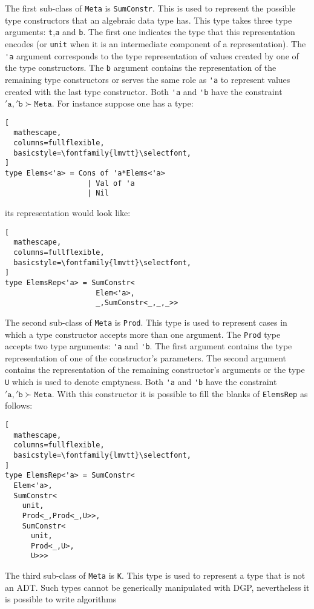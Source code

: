 \documentclass{sigplanconf}
\begin{document}
The first sub-class of \verb+Meta+ is \verb+SumConstr+. This is used
to represent the possible type constructors that an algebraic data
type has. This type takes three type arguments: \verb+t+,\verb+a+ and
\verb+b+. The first one indicates the type that this representation
encodes (or \verb+unit+ when it is an intermediate component of a
representation). The \verb+'a+ argument corresponds to the type
representation of values created by one of the type constructors. The
\verb+b+ argument contains the representation of the remaining type
constructors or serves the same role as \verb+'a+ to represent values
created with the last type constructor. Both \verb+'a+ and \verb+'b+
have the constraint $\mathtt{'a},\mathtt{'b} \succ \mathtt{Meta}$. For
instance suppose one has a type:
\begin{lstlisting}[
  mathescape,
  columns=fullflexible,
  basicstyle=\fontfamily{lmvtt}\selectfont,
]
type Elems<'a> = Cons of 'a*Elems<'a> 
                   | Val of 'a 
                   | Nil 
\end{lstlisting}
its representation would look like:
\begin{lstlisting}[
  mathescape,
  columns=fullflexible,
  basicstyle=\fontfamily{lmvtt}\selectfont,
]
type ElemsRep<'a> = SumConstr<
                     Elem<'a>,
                     _,SumConstr<_,_,_>>
\end{lstlisting}
The second sub-class of \verb+Meta+ is \verb+Prod+. This type is used
to represent cases in which a type constructor accepts more than one
argument. The \verb+Prod+ type accepts two type arguments: \verb+'a+
and \verb+'b+. The first argument contains the type representation of
one of the constructor's parameters. The second argument contains the
representation of the remaining constructor's arguments or the type
\verb+U+ which is used to denote emptyness. Both \verb+'a+ and
\verb+'b+ have the constraint $\mathtt{'a},\mathtt{'b} \succ
\mathtt{Meta}$. With this constructor it is possible to fill the
blanks of \verb+ElemsRep+ as follows:
\begin{lstlisting}[
  mathescape,
  columns=fullflexible,
  basicstyle=\fontfamily{lmvtt}\selectfont,
]
type ElemsRep<'a> = SumConstr<
  Elem<'a>,
  SumConstr<
    unit,
    Prod<_,Prod<_,U>>,
    SumConstr<
      unit,
      Prod<_,U>,
      U>>>
\end{lstlisting}
The third sub-class of \verb+Meta+ is \verb+K+. This type is used to
represent a type that is not an ADT. Such types cannot be generically
manipulated with DGP, nevertheless it is possible to write algorithms
\end{document}
